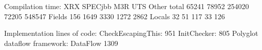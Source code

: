 Compilation time:   XRX SPECjbb     M3R UTS Other
total           65241   78952       254020  72205   548547
Fields          156 1649        3330    1272    2862
Locals          32  51      117 33  126


Implementation lines of code:
CheckEscapingThis: 951
InitChecker: 805
Polyglot dataflow framework: DataFlow 1309
